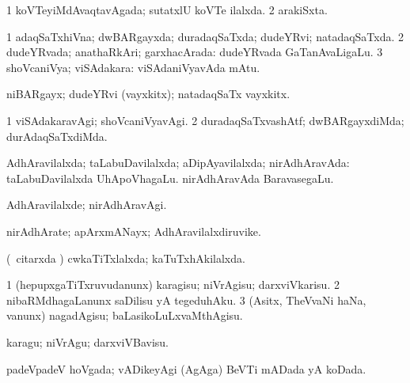 \bentry
{} 
\gl{\gu}
\expl{}
\bmng
\bnum
\num{1} koVTeyiMdAvaqtavAgada; sutatxlU koVTe ilalxda. 
\num{2} arakiSxta. 
\enum
\emng
\eentry

\bentry
{} 
\gl{\gu}
\expl{}
\bmng
\bnum
\num{1} adaqSaTxhiVna; dwBARgayxda; duradaqSaTxda; dudeYRvi; natadaqSaTxda. 
\num{2} dudeYRvada; anathaRkAri; garxhacArada:  dudeYRvada GaTanAvaLigaLu. 
\num{3} shoVcaniVya; viSAdakara:  viSAdaniVyavAda mAtu. 
\enum
\emng
\eentry

\bentry
{} 
\gl{\nA}
\expl{}
\bmng
 niBARgayx; dudeYRvi (vayxkitx); natadaqSaTx vayxkitx. 
\emng
\eentry

\bentry
{} 
\gl{\kirxvi}
\expl{}
\bmng
\bnum
\num{1} viSAdakaravAgi; shoVcaniVyavAgi. 
\num{2} duradaqSaTxvashAtf; dwBARgayxdiMda; durAdaqSaTxdiMda. 
\enum
\emng
\eentry

\bentry
{} 
\gl{\gu}
\expl{}
\bmng
AdhAravilalxda; taLabuDavilalxda; aDipAyavilalxda; nirAdhAravAda:  taLabuDavilalxda UhApoVhagaLu.  nirAdhAravAda BaravasegaLu. 
\emng
\eentry

\bentry
{} 
\gl{\kirxvi}
\expl{}
\bmng
 AdhAravilalxde; nirAdhAravAgi.\eng{} 
\emng
\eentry

\bentry
{} 
\gl{\nA}
\expl{}
\bmng
nirAdhArate; apArxmANayx; AdhAravilalxdiruvike. 
\emng
\eentry

\bentry
{} 
\gl{\gu}
\expl{}
\bmng
 (\kanmu\ citarxda \vi) cwkaTiTxlalxda; kaTuTxhAkilalxda.\eng{ } 
\emng
\eentry

\bentry
{} 
\gl{\kirx}


\noindent
\gl{\sakirx}
\expl{}
\bmng
\bnum
\num{1} (hepupxgaTiTxruvudanunx) karagisu; niVrAgisu; darxviVkarisu. 
\num{2} nibaRMdhagaLanunx saDilisu yA tegeduhAku. 
\num{3} (Asitx, TheVvaNi haNa, \mo vanunx) nagadAgisu; baLasikoLuLxvaMthAgisu. 
\enum
\emng

\noindent 
\gl{\akirx}
\expl{}
\bmng
karagu; niVrAgu; darxviVBavisu. 
\emng
\eentry

\bentry
{} 
\gl{\gu}
\expl{}
\bmng
padeVpadeV hoVgada; vADikeyAgi (AgAga) BeVTi mADada yA koDada. 
\emng
\eentry

